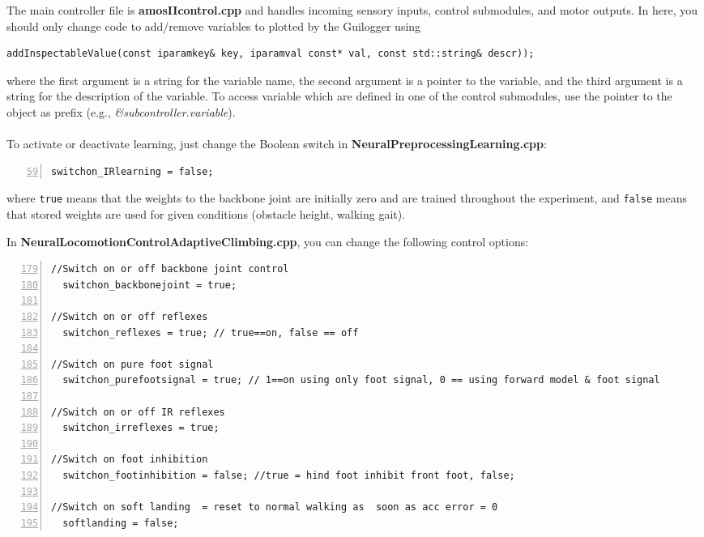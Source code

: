 \documentclass[a3, 14pt]{sciposter}
\begin{document}
\begin{multicols}{2}
The main controller file is \textbf{amosIIcontrol.cpp} and handles incoming sensory inputs, control submodules, and motor outputs. In here, you should only change code to add/remove variables to plotted by the Guilogger using

\begin{lstlisting}[numbers=none]
addInspectableValue(const iparamkey& key, iparamval const* val, const std::string& descr));
\end{lstlisting}

where the first argument is a string for the variable name, the second argument is a pointer to the variable, and the third argument is a string for the description of the variable. To access variable which are defined in one of the control submodules, use the pointer to the object as prefix (e.g., \textit{\&subcontroller.variable}).
\\ \\
To activate or deactivate learning, just change the Boolean switch in \textbf{NeuralPreprocessingLearning.cpp}:

\begin{lstlisting}[numbers = left, firstnumber = 59]
 switchon_IRlearning = false;
\end{lstlisting}

where \texttt{true} means that the weights to the backbone joint are initially zero and are trained throughout the experiment, and \texttt{false} means that stored weights are used for given conditions (obstacle height, walking gait).

\vspace{0.5cm}

In \textbf{NeuralLocomotionControlAdaptiveClimbing.cpp}, you can change the following control options:
\begin{lstlisting}[numbers = left, firstnumber = 179]
//Switch on or off backbone joint control
  switchon_backbonejoint = true;

//Switch on or off reflexes
  switchon_reflexes = true; // true==on, false == off

//Switch on pure foot signal
  switchon_purefootsignal = true; // 1==on using only foot signal, 0 == using forward model & foot signal

//Switch on or off IR reflexes
  switchon_irreflexes = true;

//Switch on foot inhibition
  switchon_footinhibition = false; //true = hind foot inhibit front foot, false;

//Switch on soft landing  = reset to normal walking as  soon as acc error = 0
  softlanding = false;
\end{lstlisting}


\end{multicols}
\end{document}

